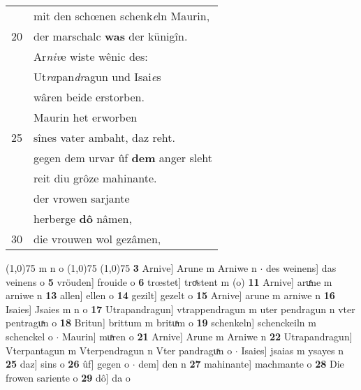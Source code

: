 \documentclass[8pt,a4paper,notitlepage]{article}
\begin{document}
\begin{table}[ht]
\begin{minipage}[t]{0.5\linewidth}
\begin{tabular}{rl}
 & mit den schœnen schenk\textit{e}ln Maurin,\\ 
20 & der marschalc \textbf{was} der künigîn.\\ 
 & Ar\textit{niv}e wiste wênic des:\\ 
 & Ut\textit{ra}pan\textit{dr}agun und Isai\textit{e}s\\ 
 & wâren beide erstorben.\\ 
 & Maurin het erworben\\ 
25 & sînes vater ambaht, daz reht.\\ 
 & gegen dem urvar ûf \textbf{dem} anger sleht\\ 
 & reit diu grôze mahinante.\\ 
 & der vrowen sarjante\\ 
 & herberge \textbf{dô} nâmen,\\ 
30 & die vrouwen wol gezâmen,\\ 
\end{tabular}
\scriptsize
\line(1,0){75} \newline
m n o \newline
\line(1,0){75} \newline
\newline
\line(1,0){75} \newline
\textbf{3} Arnive] Arune m Arniwe n  $\cdot$ des weinens] das veinens o \textbf{5} vröuden] frouide o \textbf{6} trœstet] troͯstent m (o) \textbf{11} Arnive] aruͯne m arniwe n \textbf{13} allen] ellen o \textbf{14} gezilt] gezelt o \textbf{15} Arnive] arune m arniwe n \textbf{16} Isaies] Jsaies m n o \textbf{17} Utrapandragun] vtrappendragun m uter pendragun n vter pentraguͯn o \textbf{18} Britun] brittum m brituͯm o \textbf{19} schenkeln] schenckeiln m schenckel o  $\cdot$ Maurin] muͯren o \textbf{21} Arnive] Arune m Arniwe n \textbf{22} Utrapandragun] Vterpantagun m Vterpendragun n Vter pandraguͯn o  $\cdot$ Isaies] jsaias m ysayes n \textbf{25} daz] sins o \textbf{26} ûf] gegen o  $\cdot$ dem] den n \textbf{27} mahinante] machmante o \textbf{28} Die frowen sariente o \textbf{29} dô] da o \newline
\end{minipage}
\end{table}
\newpage
\end{document}
